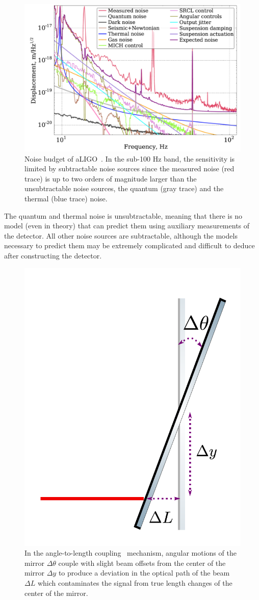 \begin{refsection}
\begin{figure}[htbp]
   \centering
   \includegraphics[width=\columnwidth]{chapter_noise_sub/etc/noiseBudget}
   \caption[Noise Budget]{Noise budget of aLIGO~\cite{Martynov:16}.
     In the sub-100 Hz band, the sensitivity is limited by subtractable noise sources since the measured noise (red trace) is up to two orders of magnitude larger than the unsubtractable noise sources, the quantum (gray trace) and the thermal (blue trace) noise.}
   \label{fig:noiseBudget}
\end{figure}

The quantum and thermal noise is unsubtractable, meaning that there is no model (even in theory) that can predict them using auxiliary measurements of the detector. All other noise sources are subtractable, although the models necessary to predict them may be extremely complicated and difficult to deduce after constructing the detector. 


\begin{figure}[htbp]
   \centering
   \includegraphics[width=0.28\columnwidth]{chapter_noise_sub/etc/a2l}
   \caption{In the angle-to-length coupling~\cite{Yu:19} mechanism, angular motions of the mirror $\Delta \theta$ couple with slight beam offsets from the center of the mirror $\Delta y$ to produce a deviation in the optical path of the beam $\Delta L$ which contaminates the signal from true length changes of the center of the mirror.}
   \label{fig:a2l}
\end{figure}


\end{refsection}
